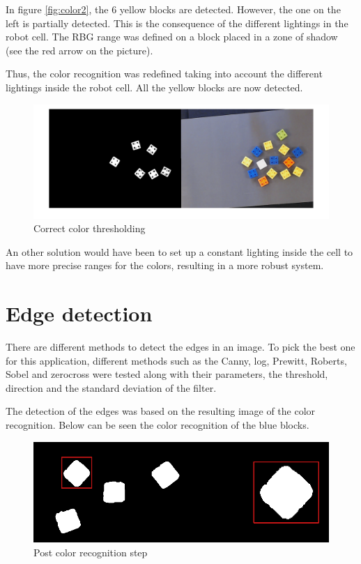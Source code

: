 In figure \ref{fig:color2}, the 6 yellow blocks are detected. However, the one on the left is partially detected. This is the consequence of the different lightings in the robot cell. The RBG range was defined on a block placed in a zone of shadow (see the red arrow on the picture). \par


Thus, the color recognition was redefined taking into account the different lightings inside the robot cell. All the yellow blocks are now detected.



\begin{figure}[hb]
  \centering
  \includegraphics[scale=0.3]{figures/Thres_Y_good.png}
  \caption[LABEL] {Correct color thresholding}
\end{figure}

An other solution would have been to set up a constant lighting inside the cell to have more precise ranges for the colors, resulting in a more robust system.



 \section{Edge detection}

	There are different methods to detect the edges in an image. To pick the best one for this application, different methods such as the Canny, log, Prewitt, Roberts, Sobel and zerocross were tested along with their parameters, the threshold, direction and the standard deviation of the filter. \par


	The detection of the edges was based on the resulting image of the color recognition. Below can be seen the color recognition of the blue blocks.

	\begin{figure}[hb]
  \centering
  \includegraphics[scale=0.3]{figures/color_rec_zoom.png}
  \caption[LABEL] {Post color recognition step}
\end{figure}	
	



